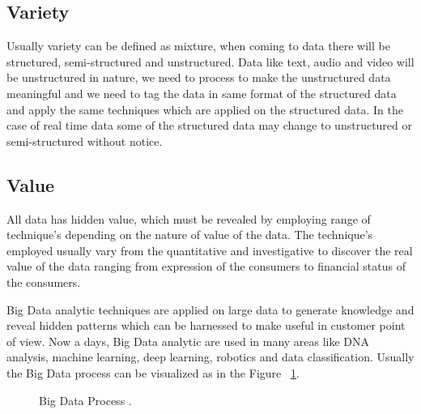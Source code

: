 \documentclass[sigconf]{acmart}
\begin{document}
\subsection{Variety}

Usually variety can be defined as mixture, when coming to data there will be structured, semi-structured and unstructured. Data like text, audio and video will be unstructured in nature, we need to process to make the unstructured data meaningful and we need to tag the data in same format of the structured data and apply the same techniques which are applied on the structured data. In the case of real time data some of the structured data may change to unstructured or semi-structured without notice.

\subsection{Value}

All data has hidden value, which must be revealed by employing range of technique's depending on the nature of value of the data. The technique's employed usually vary from the quantitative and investigative to discover the real value of the data ranging from expression of the consumers to financial status of the consumers.


Big Data analytic techniques are applied on large data to generate knowledge and reveal hidden patterns which can be harnessed to make useful in customer point of view. Now a days, Big Data analytic are used in many areas like DNA analysis, machine learning, deep learning, robotics and data classification. Usually the Big Data process can be visualized as in the Figure ~\ref{fig:BD}.


\begin{figure}
\centering
{}
\caption{Big Data Process \cite{bigdata}.}
\label{fig:BD}
\end{figure}
\end{document}
